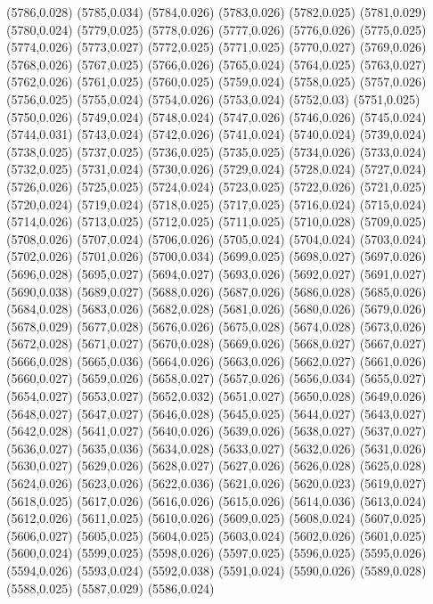 (5786,0.028)
(5785,0.034)
(5784,0.026)
(5783,0.026)
(5782,0.025)
(5781,0.029)
(5780,0.024)
(5779,0.025)
(5778,0.026)
(5777,0.026)
(5776,0.026)
(5775,0.025)
(5774,0.026)
(5773,0.027)
(5772,0.025)
(5771,0.025)
(5770,0.027)
(5769,0.026)
(5768,0.026)
(5767,0.025)
(5766,0.026)
(5765,0.024)
(5764,0.025)
(5763,0.027)
(5762,0.026)
(5761,0.025)
(5760,0.025)
(5759,0.024)
(5758,0.025)
(5757,0.026)
(5756,0.025)
(5755,0.024)
(5754,0.026)
(5753,0.024)
(5752,0.03)
(5751,0.025)
(5750,0.026)
(5749,0.024)
(5748,0.024)
(5747,0.026)
(5746,0.026)
(5745,0.024)
(5744,0.031)
(5743,0.024)
(5742,0.026)
(5741,0.024)
(5740,0.024)
(5739,0.024)
(5738,0.025)
(5737,0.025)
(5736,0.025)
(5735,0.025)
(5734,0.026)
(5733,0.024)
(5732,0.025)
(5731,0.024)
(5730,0.026)
(5729,0.024)
(5728,0.024)
(5727,0.024)
(5726,0.026)
(5725,0.025)
(5724,0.024)
(5723,0.025)
(5722,0.026)
(5721,0.025)
(5720,0.024)
(5719,0.024)
(5718,0.025)
(5717,0.025)
(5716,0.024)
(5715,0.024)
(5714,0.026)
(5713,0.025)
(5712,0.025)
(5711,0.025)
(5710,0.028)
(5709,0.025)
(5708,0.026)
(5707,0.024)
(5706,0.026)
(5705,0.024)
(5704,0.024)
(5703,0.024)
(5702,0.026)
(5701,0.026)
(5700,0.034)
(5699,0.025)
(5698,0.027)
(5697,0.026)
(5696,0.028)
(5695,0.027)
(5694,0.027)
(5693,0.026)
(5692,0.027)
(5691,0.027)
(5690,0.038)
(5689,0.027)
(5688,0.026)
(5687,0.026)
(5686,0.028)
(5685,0.026)
(5684,0.028)
(5683,0.026)
(5682,0.028)
(5681,0.026)
(5680,0.026)
(5679,0.026)
(5678,0.029)
(5677,0.028)
(5676,0.026)
(5675,0.028)
(5674,0.028)
(5673,0.026)
(5672,0.028)
(5671,0.027)
(5670,0.028)
(5669,0.026)
(5668,0.027)
(5667,0.027)
(5666,0.028)
(5665,0.036)
(5664,0.026)
(5663,0.026)
(5662,0.027)
(5661,0.026)
(5660,0.027)
(5659,0.026)
(5658,0.027)
(5657,0.026)
(5656,0.034)
(5655,0.027)
(5654,0.027)
(5653,0.027)
(5652,0.032)
(5651,0.027)
(5650,0.028)
(5649,0.026)
(5648,0.027)
(5647,0.027)
(5646,0.028)
(5645,0.025)
(5644,0.027)
(5643,0.027)
(5642,0.028)
(5641,0.027)
(5640,0.026)
(5639,0.026)
(5638,0.027)
(5637,0.027)
(5636,0.027)
(5635,0.036)
(5634,0.028)
(5633,0.027)
(5632,0.026)
(5631,0.026)
(5630,0.027)
(5629,0.026)
(5628,0.027)
(5627,0.026)
(5626,0.028)
(5625,0.028)
(5624,0.026)
(5623,0.026)
(5622,0.036)
(5621,0.026)
(5620,0.023)
(5619,0.027)
(5618,0.025)
(5617,0.026)
(5616,0.026)
(5615,0.026)
(5614,0.036)
(5613,0.024)
(5612,0.026)
(5611,0.025)
(5610,0.026)
(5609,0.025)
(5608,0.024)
(5607,0.025)
(5606,0.027)
(5605,0.025)
(5604,0.025)
(5603,0.024)
(5602,0.026)
(5601,0.025)
(5600,0.024)
(5599,0.025)
(5598,0.026)
(5597,0.025)
(5596,0.025)
(5595,0.026)
(5594,0.026)
(5593,0.024)
(5592,0.038)
(5591,0.024)
(5590,0.026)
(5589,0.028)
(5588,0.025)
(5587,0.029)
(5586,0.024)
